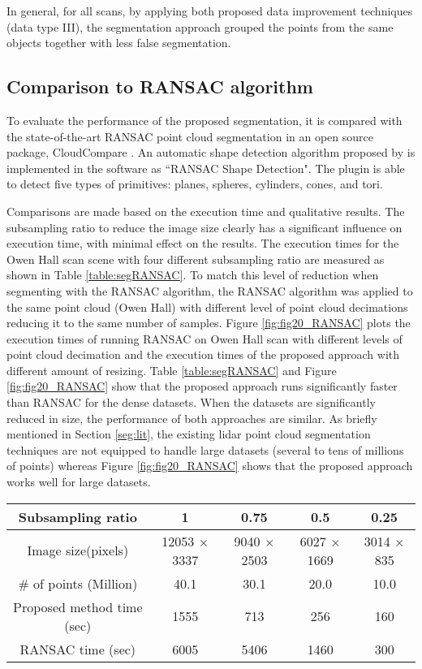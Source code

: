 \documentclass[final,3p,times,twocolumn,authoryear]{elsarticle}
\begin{document}
In general, for all scans, by applying both proposed data improvement techniques (data type III), the segmentation approach grouped the points from the same objects together with less false segmentation.

\subsection{Comparison to RANSAC algorithm}

To evaluate the performance of the proposed segmentation, it is compared with the state-of-the-art RANSAC point cloud segmentation in an open source package, CloudCompare \cite{cloudcompare}. An automatic shape detection algorithm proposed by \cite{schnabel2007} is implemented in the software as ``RANSAC Shape Detection". The plugin is able to detect five types of primitives: planes, spheres, cylinders, cones, and tori. 

Comparisons are made based on the execution time and qualitative results. The subsampling ratio to reduce the image size clearly has a significant influence on execution time, with minimal effect on the results. The execution times for the Owen Hall scan scene with four different subsampling ratio are measured as shown in Table \ref{table:segRANSAC}. To match this level of reduction when segmenting with the RANSAC algorithm, the RANSAC algorithm was applied to the same point cloud (Owen Hall) with different level of point cloud decimations reducing it to the same number of samples. Figure \ref{fig:fig20_RANSAC} plots the execution times of running RANSAC on Owen Hall scan with different levels of point cloud decimation and the execution times of the proposed approach with different amount of resizing. Table \ref{table:segRANSAC} and Figure \ref{fig:fig20_RANSAC} show that the proposed approach runs significantly faster than RANSAC for the dense datasets. When the datasets are significantly reduced in size, the performance of both approaches are similar.  
As briefly mentioned in Section \ref{seg:lit}, the existing lidar point cloud segmentation techniques are not equipped to handle large datasets (several to tens of millions of points) whereas Figure \ref{fig:fig20_RANSAC} shows that the proposed approach works well for large datasets.  

\begin{table*}
	\centering
	\caption{Comparison of the execution time between the proposed method and RANSAC for the Owen Hall dataset}	
	\begin{tabular}{c|cccc}
		 Subsampling ratio & 1 & 0.75 & 0.5 & 0.25 \\ 
\hline		 Image size(pixels) & 12053 $\times$ 3337 & 9040 $\times$ 2503 & 6027 $\times$ 1669 & 3014 $\times$ 835 \\ 
		 \# of points (Million) & 40.1 & 30.1 & 20.0 & 10.0 \\ 
		 Proposed method time (sec) & 1555 & 713 & 256 & 160 \\ 
		 RANSAC time (sec) & 6005 & 5406 & 1460 & 300 \\ 
	\end{tabular}
	\label{table:segRANSAC} 
\end{table*}
\end{document}
